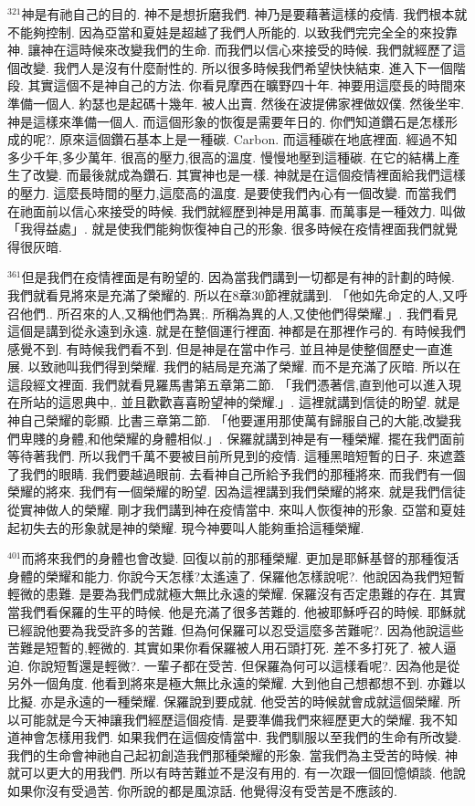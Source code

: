 \documentclass{book}
\begin{document}
$^{321}$神是有祂自己的目的.
神不是想折磨我們.
神乃是要藉著這樣的疫情.
我們根本就不能夠控制.
因為亞當和夏娃是超越了我們人所能的.
以致我們完完全全的來投靠神.
讓神在這時候來改變我們的生命.
而我們以信心來接受的時候.
我們就經歷了這個改變.
我們人是沒有什麼耐性的.
所以很多時候我們希望快快結束.
進入下一個階段.
其實這個不是神自己的方法.
你看見摩西在曠野四十年.
神要用這麼長的時間來準備一個人.
約瑟也是起碼十幾年.
被人出賣.
然後在波提佛家裡做奴僕.
然後坐牢.
神是這樣來準備一個人.
而這個形象的恢復是需要年日的.
你們知道鑽石是怎樣形成的呢?.
原來這個鑽石基本上是一種碳.
Carbon.
而這種碳在地底裡面.
經過不知多少千年,多少萬年.
很高的壓力,很高的溫度.
慢慢地壓到這種碳.
在它的結構上產生了改變.
而最後就成為鑽石.
其實神也是一樣.
神就是在這個疫情裡面給我們這樣的壓力.
這麼長時間的壓力,這麼高的溫度.
是要使我們內心有一個改變.
而當我們在祂面前以信心來接受的時候.
我們就經歷到神是用萬事.
而萬事是一種效力.
叫做「我得益處」.
就是使我們能夠恢復神自己的形象.
很多時候在疫情裡面我們就覺得很灰暗.

$^{361}$但是我們在疫情裡面是有盼望的.
因為當我們講到一切都是有神的計劃的時候.
我們就看見將來是充滿了榮耀的.
所以在8章30節裡就講到.
「他如先命定的人,又呼召他們..
所召來的人,又稱他們為異;.
所稱為異的人,又使他們得榮耀.」.
我們看見這個是講到從永遠到永遠.
就是在整個運行裡面.
神都是在那裡作弓的.
有時候我們感覺不到.
有時候我們看不到.
但是神是在當中作弓.
並且神是使整個歷史一直進展.
以致祂叫我們得到榮耀.
我們的結局是充滿了榮耀.
而不是充滿了灰暗.
所以在這段經文裡面.
我們就看見羅馬書第五章第二節.
「我們憑著信,直到他可以進入現在所站的這恩典中,.
並且歡歡喜喜盼望神的榮耀.」.
這裡就講到信徒的盼望.
就是神自己榮耀的彰顯.
比書三章第二節.
「他要運用那使萬有歸服自己的大能,改變我們卑賤的身體,和他榮耀的身體相似.」.
保羅就講到神是有一種榮耀.
擺在我們面前等待著我們.
所以我們千萬不要被目前所見到的疫情.
這種黑暗短暫的日子.
來遮蓋了我們的眼睛.
我們要越過眼前.
去看神自己所給予我們的那種將來.
而我們有一個榮耀的將來.
我們有一個榮耀的盼望.
因為這裡講到我們榮耀的將來.
就是我們信徒從實神做人的榮耀.
剛才我們講到神在疫情當中.
來叫人恢復神的形象.
亞當和夏娃起初失去的形象就是神的榮耀.
現今神要叫人能夠重拾這種榮耀.

$^{401}$而將來我們的身體也會改變.
回復以前的那種榮耀.
更加是耶穌基督的那種復活身體的榮耀和能力.
你說今天怎樣?太遙遠了.
保羅他怎樣說呢?.
他說因為我們短暫輕微的患難.
是要為我們成就極大無比永遠的榮耀.
保羅沒有否定患難的存在.
其實當我們看保羅的生平的時候.
他是充滿了很多苦難的.
他被耶穌呼召的時候.
耶穌就已經說他要為我受許多的苦難.
但為何保羅可以忍受這麼多苦難呢?.
因為他說這些苦難是短暫的,輕微的.
其實如果你看保羅被人用石頭打死.
差不多打死了.
被人逼迫.
你說短暫還是輕微?.
一輩子都在受苦.
但保羅為何可以這樣看呢?.
因為他是從另外一個角度.
他看到將來是極大無比永遠的榮耀.
大到他自己想都想不到.
亦難以比擬.
亦是永遠的一種榮耀.
保羅說到要成就.
他受苦的時候就會成就這個榮耀.
所以可能就是今天神讓我們經歷這個疫情.
是要準備我們來經歷更大的榮耀.
我不知道神會怎樣用我們.
如果我們在這個疫情當中.
我們馴服以至我們的生命有所改變.
我們的生命會神祂自己起初創造我們那種榮耀的形象.
當我們為主受苦的時候.
神就可以更大的用我們.
所以有時苦難並不是沒有用的.
有一次跟一個回憶傾談.
他說如果你沒有受過苦.
你所說的都是風涼話.
他覺得沒有受苦是不應該的.
\end{document}
